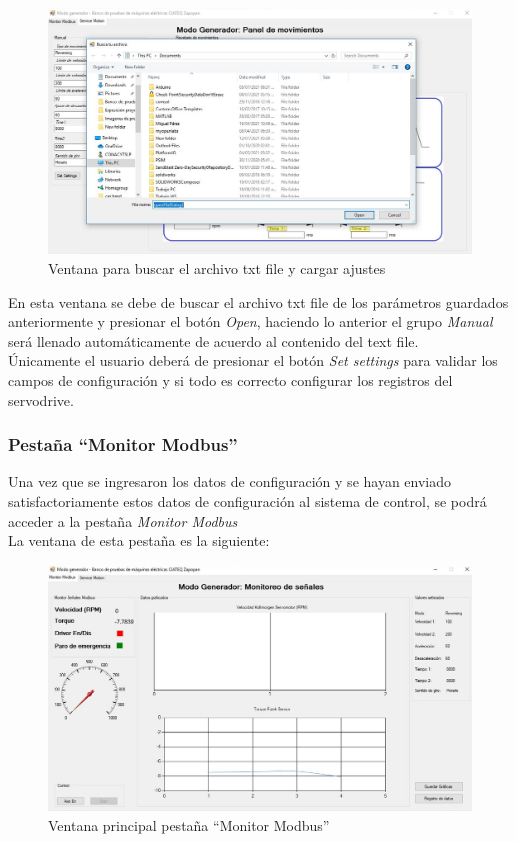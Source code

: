 \documentclass[12pt,titlepage]{article}
\begin{document}
\begin{figure}[htbp]
\hspace*{1.2cm} 
\includegraphics[scale=0.48]{buscar_archivo}
\caption{Ventana para buscar el archivo txt file y cargar ajustes}
\end{figure}

En esta ventana se debe de buscar el archivo txt file de los parámetros guardados anteriormente y  presionar el botón \textit{Open}, haciendo lo anterior el grupo \textit{Manual} será llenado automáticamente de acuerdo al contenido del text file. \\ 

Únicamente el usuario deberá de presionar el botón \textit{Set settings} para validar los campos de configuración y si todo es correcto configurar los registros del servodrive. \\ 
\newpage
\subsubsection{Pestaña ``Monitor Modbus'' }
Una vez que se ingresaron los datos de configuración y se hayan enviado satisfactoriamente estos datos de configuración al sistema de control, se podrá acceder a la pestaña \textit{Monitor Modbus}\\

La ventana de esta pestaña es la siguiente: \\ 
\begin{figure}[htbp]
\hspace*{0.2cm} 
\includegraphics[scale=0.55]{Monitor_modbus}
\caption{Ventana principal pestaña  ``Monitor Modbus'' }
\end{figure}
\end{document}
